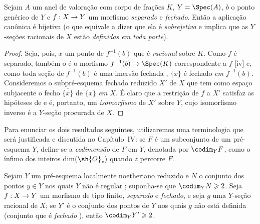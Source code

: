 \documentclass[oneside,10pt]{amsart}
\makeatletter
\renewcommand{\geq}{\geqslant}
\newcommand{\ega@arrow}[2]{\mathchoice{#1}{#2}{#2}{#2}}
\renewcommand{\to}{\ega@arrow{\longrightarrow}{\rightarrow}}
\newcommand{\oldpage}[2][]{\marginnote{\normalfont\footnotesize\textbf{#1}~|~#2}\ignorespaces}
\let\EGAOriginalLabel\label
\renewcommand{\label}[1]{\phantomsection\EGAOriginalLabel{#1}}
\makeatother
\begin{document}
\begin{proposition}[7.3.3]
\label{II.7.3.3}
Sejam $A$ um anel de valoração com corpo de frações $K$, $Y=\Spec(A)$, $b$ o ponto genérico de $Y$ e $f:X\to Y$ um morfismo \emph{separado} e \emph{fechado}.
Então a aplicação canônica  é bijetiva (o que equivale a dizer que ela é \emph{sobrejetiva} e implica que as $Y$-seções racionais de $X$ estão \emph{definidas em toda parte}).
\end{proposition}

\begin{proof}
Seja, pois, $x$ um ponto de $f^{-1}(b)$ que é \emph{racional} sobre $K$.
Como $f$ é separado, também o é o morfismo $f^{-1}(b)\to\Spec(K)$ correspondente a $f$ [iv] e, como toda seção de $f^{-1}(b)$ é uma imersão fechada , $\{x\}$ é fechado \emph{em $f^{-1}(b)$}.
Consideremos o subpré-esquema fechado reduzido $X'$ de $X$ que tem como espaço subjacente o fecho $\overline{\{x\}}$ de $\{x\}$ \emph{em $X$}.
É claro que a restrição de $f$ a $X'$ satisfaz as hipóteses de  e é, portanto, um \emph{isomorfismo} de $X'$ sobre $Y$, cujo isomorfismo inverso é a $Y$-seção procurada de $X$.
\end{proof}

\begin{env}[7.3.4]
\label{II.7.3.4}
Para enunciar os dois resultados seguintes, utilizaremos uma terminologia que será justificada e discutida no Capítulo~IV: se $F$ é um subconjunto
\oldpage[II]{144}
de um pré-esquema $Y$, define-se a \emph{codimensão} de $F$ em $Y$, denotada por $\codim_Y F$, como o ínfimo dos inteiros $\dim(\sh{O}_z)$ quando $z$ percorre $F$.
\end{env}

\begin{corollary}[7.3.5]
\label{II.7.3.5}
Sejam $Y$ um pré-esquema localmente noetheriano reduzido e $N$ o conjunto dos pontos $y\in Y$ nos quais $Y$ não é regular ;
suponha-se que $\codim_Y N\geq2$.
Seja $f:X\to Y$ um morfismo de tipo finito, \emph{separado} e \emph{fechado}, e seja $g$ uma $Y$-seção racional de $X$;
se $Y'$ é o conjunto dos pontos de $Y$ nos quais $g$ não está definida (conjunto que é \emph{fechado} ), então $\codim_Y Y'\geq2$.
\end{corollary}
\end{document}
